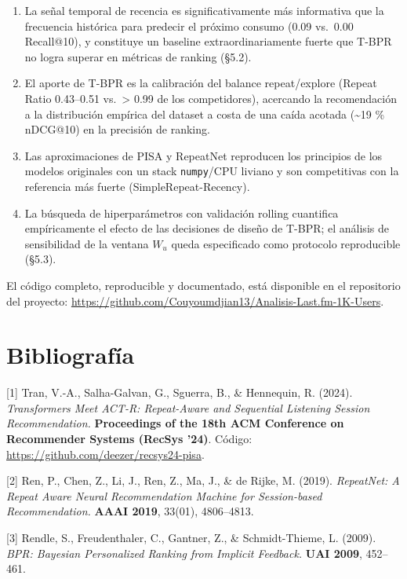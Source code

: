 \documentclass{article}
\providecommand{\tightlist}{%
  \setlength{\itemsep}{0pt}\setlength{\parskip}{0pt}}
\begin{document}
\begin{enumerate}
\def\labelenumi{\arabic{enumi}.}
\tightlist
\item
  La señal temporal de recencia es significativamente más informativa que la frecuencia histórica para predecir el próximo consumo (0.09 vs.~0.00 Recall@10), y constituye un baseline extraordinariamente fuerte que T-BPR no logra superar en métricas de ranking (§5.2).
\item
  El aporte de T-BPR es la calibración del balance repeat/explore (Repeat Ratio 0.43--0.51 vs.~\textgreater{} 0.99 de los competidores), acercando la recomendación a la distribución empírica del dataset a costa de una caída acotada (\textasciitilde19 \% nDCG@10) en la precisión de ranking.
\item
  Las aproximaciones de PISA y RepeatNet reproducen los principios de los modelos originales con un stack \texttt{numpy}/CPU liviano y son competitivas con la referencia más fuerte (SimpleRepeat-Recency).
\item
  La búsqueda de hiperparámetros con validación rolling cuantifica empíricamente el efecto de las decisiones de diseño de T-BPR; el análisis de sensibilidad de la ventana \(W_u\) queda especificado como protocolo reproducible (§5.3).
\end{enumerate}

El código completo, reproducible y documentado, está disponible en el repositorio del proyecto: \url{https://github.com/Couyoumdjian13/Analisis-Last.fm-1K-Users}.

\section*{Bibliografía}\label{bibliografuxeda}

{[}1{]} Tran, V.-A., Salha-Galvan, G., Sguerra, B., \& Hennequin, R. (2024). \emph{Transformers Meet ACT-R: Repeat-Aware and Sequential Listening Session Recommendation.} \textbf{Proceedings of the 18th ACM Conference on Recommender Systems (RecSys '24)}. Código: \url{https://github.com/deezer/recsys24-pisa}.

{[}2{]} Ren, P., Chen, Z., Li, J., Ren, Z., Ma, J., \& de Rijke, M. (2019). \emph{RepeatNet: A Repeat Aware Neural Recommendation Machine for Session-based Recommendation.} \textbf{AAAI 2019}, 33(01), 4806--4813.

{[}3{]} Rendle, S., Freudenthaler, C., Gantner, Z., \& Schmidt-Thieme, L. (2009). \emph{BPR: Bayesian Personalized Ranking from Implicit Feedback.} \textbf{UAI 2009}, 452--461.
\end{document}
